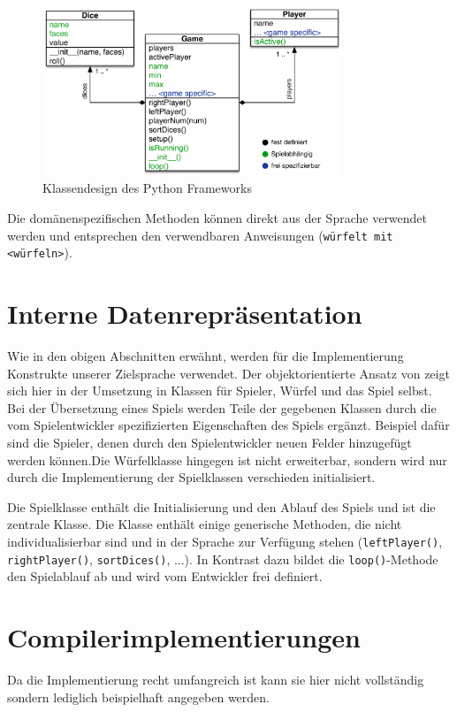     \begin{figure}[ht]
    	\centering
        \includegraphics[width=0.8\textwidth]{Python-UML.pdf}
    	\caption{Klassendesign des Python Frameworks}
    	\label{python-uml}
    \end{figure}

    Die domänenspezifischen Methoden können direkt aus der Sprache verwendet werden und entsprechen den verwendbaren Anweisungen (\texttt{würfelt mit <würfeln>}).

\section{Interne Datenrepräsentation}
\label{sec:interne_datenreprasentation}
    Wie in den obigen Abschnitten erwähnt, werden für die Implementierung Konstrukte unserer Zielsprache verwendet. Der objektorientierte Ansatz von \dg zeigt sich hier in der Umsetzung in Klassen für Spieler, Würfel und das Spiel selbst. Bei der Übersetzung eines Spiels werden Teile der gegebenen Klassen durch die vom Spielentwickler spezifizierten Eigenschaften des Spiels ergänzt. Beispiel dafür sind die Spieler, denen durch den Spielentwickler neuen Felder hinzugefügt werden können.Die Würfelklasse hingegen ist nicht erweiterbar, sondern wird nur durch die Implementierung der Spielklassen verschieden initialisiert.

    Die Spielklasse enthält die Initialisierung und den Ablauf des Spiels und ist die zentrale Klasse. Die Klasse enthält einige generische Methoden, die nicht individualisierbar sind und in der Sprache zur Verfügung stehen (\texttt{leftPlayer()}, \texttt{rightPlayer()}, \texttt{sortDices()}, ...). In Kontrast dazu bildet die \texttt{loop()}-Methode den Spielablauf ab und wird vom Entwickler frei definiert.

\section{Compilerimplementierungen}
\label{sec:compilerimplementierungen}
	Da die Implementierung recht umfangreich ist kann sie hier nicht vollständig sondern lediglich beispielhaft angegeben werden.

